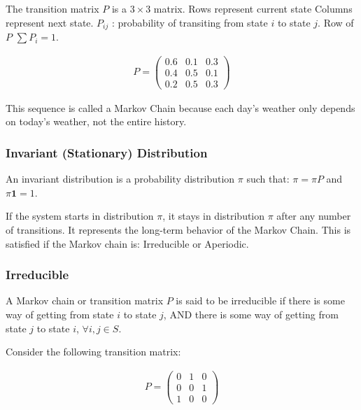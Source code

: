 The transition matrix $P$ is a $3\times 3$ matrix. Rows represent current state
Columns represent next state. $P_{ij}$ : probability of transiting from state $i$ to state $j$. Row of $P$ $\sum P_{i} = 1$.

\begin{align*}
    P = 
    \begin{pmatrix}
        0.6 & 0.1 & 0.3\\
        0.4 & 0.5 & 0.1\\
        0.2 & 0.5 & 0.3
    \end{pmatrix}
\end{align*}

This sequence is called a Markov Chain because each day’s weather only depends on today’s weather, not the entire history.

\subsubsection{Invariant (Stationary) Distribution}

\indent 

An invariant distribution is a probability distribution $\pi$ such that: $\pi = \pi P$ and $\pi \mathbf{1} = 1$.

If the system starts in distribution $\pi$, it stays in distribution $\pi$ after any number of transitions. It represents the long-term behavior of the Markov Chain. This is satisfied if the Markov chain is: Irreducible or Aperiodic.

\subsubsection{Irreducible}

\indent 

A Markov chain or transition matrix $P$ is said to be irreducible if there is some way of getting from state $i$ to state $j$, AND there is some way of getting from state $j$ to state $i$, $\forall i,j\in S$.

Consider the following transition matrix:

\begin{align*}
    P = 
    \begin{pmatrix}
        0 & 1 & 0\\
        0 & 0 & 1\\
        1 & 0 & 0
    \end{pmatrix}
\end{align*}

